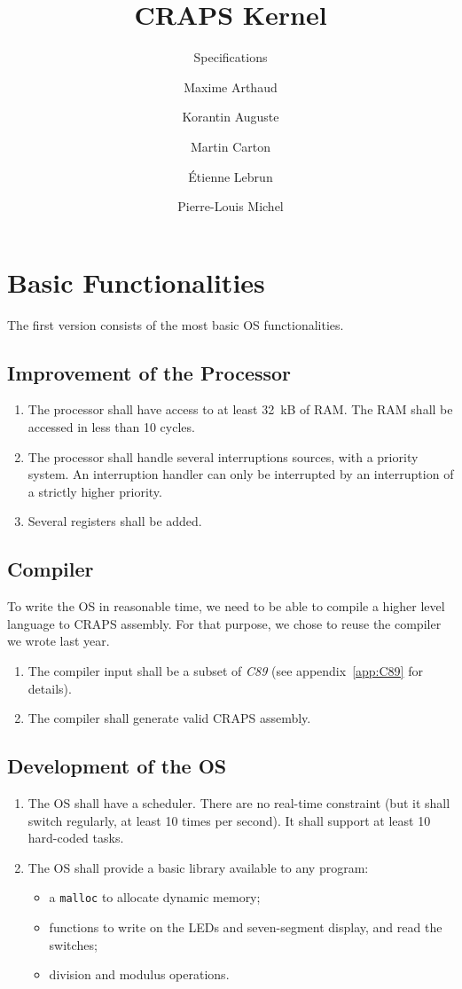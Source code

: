 \documentclass{article}
\title{CRAPS Kernel}
\subtitle{Specifications}
\author{
       Maxime Arthaud
  \and Korantin Auguste
  \and Martin Carton
  \and Étienne Lebrun
  \and Pierre-Louis Michel
}
\begin{document}
  
  \newpage
    \section{Basic Functionalities}
      The first version consists of the most basic OS functionalities.

      \subsection{Improvement of the Processor}
        \begin{enumerate}
          \item The processor shall have access to at least \SI{32}{kB} of RAM.
            The RAM shall be accessed in less than 10 cycles.
          \item The processor shall handle several interruptions sources, with
            a priority system. An interruption handler can only be interrupted
            by an interruption of a strictly higher priority.
          \item Several registers shall be added.
        \end{enumerate}

      \subsection{Compiler}
        To write the OS in reasonable time, we need to be able to compile a
        higher level language to CRAPS assembly. For that purpose, we chose to
        reuse the compiler we wrote last year.
        \begin{enumerate}
          \item The compiler input shall be a subset of \textit{C89} (see
            appendix~\ref{app:C89} for details).
          \item The compiler shall generate valid CRAPS assembly.
        \end{enumerate}

      \subsection{Development of the OS}
        \begin{enumerate}
          \item The OS shall have a scheduler. There are no real-time
          constraint (but it shall switch regularly, at least 10 times per
          second). It shall support at least 10 hard-coded tasks.
          \item The OS shall provide a basic library available to any program:
            \begin{itemize}
              \item a \verb+malloc+ to allocate dynamic memory;
              \item functions to write on the LEDs and seven-segment display,
                and read the switches;
              \item division and modulus operations.
             \end{itemize}
        \end{enumerate}
\end{document}
